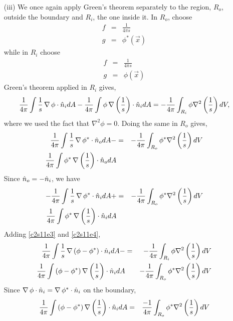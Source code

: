 \begin{enumerate}
\begin{itemize}
\item[(iii)] We once again apply Green's theorem separately to the region, $R_o$, outside the boundary and $R_i$, the one inside it. In $R_o$, choose
\begin{eqnarray*}
f &=& \frac{1}{4\pi s} \\
g &=& \phi^\ast(\vec{x})
\end{eqnarray*}
while in $R_i$ choose
\begin{eqnarray*}
f &=& \frac{1}{4\pi s} \\
g &=& \phi(\vec{x})
\end{eqnarray*}
Green's theorem applied in $R_i$ gives,
\begin{equation}\label{c2s11e3}
\frac{1}{4\pi}\int \frac{1}{s}\operatorname{\nabla}\phi\cdot\hat{n}_i dA - \frac{1}{4\pi}\int\phi\operatorname{\nabla}\left(\frac{1}{s}\right)\cdot\hat{n}_i dA = -\frac{1}{4\pi}\int_{R_i}\phi\nabla^2\left(\frac{1}{s}\right)dV,
\end{equation}
where we used the fact that $\nabla^2\phi = 0$. Doing the same in $R_o$ gives,
\begin{eqnarray*}
\frac{1}{4\pi}\int \frac{1}{s}\operatorname{\nabla}\phi^\ast\cdot\hat{n}_o dA - &=& -\frac{1}{4\pi}\int_{R_o}\phi^\ast\nabla^2\left(\frac{1}{s}\right)dV \\
\frac{1}{4\pi}\int\phi^\ast\operatorname{\nabla}\left(\frac{1}{s}\right)\cdot\hat{n}_o dA & & 
\end{eqnarray*}
Since $\hat{n}_o = -\hat{n}_i$, we have
\begin{eqnarray}
-\frac{1}{4\pi}\int \frac{1}{s}\operatorname{\nabla}\phi^\ast\cdot\hat{n}_i dA + &=& -\frac{1}{4\pi}\int_{R_o}\phi^\ast\nabla^2\left(\frac{1}{s}\right)dV \label{c2s11e4} \\
\frac{1}{4\pi}\int\phi^\ast\operatorname{\nabla}\left(\frac{1}{s}\right)\cdot\hat{n}_i dA & & \nonumber
\end{eqnarray}
Adding \eqref{c2s11e3} and \eqref{c2s11e4},
\begin{eqnarray*}
\frac{1}{4\pi}\int \frac{1}{s}\operatorname{\nabla}\left(\phi - \phi^\ast\right)\cdot\hat{n}_i dA - &=& -\frac{1}{4\pi}\int_{R_i}\phi\nabla^2\left(\frac{1}{s}\right)dV \\
\frac{1}{4\pi}\int\left(\phi - \phi^\ast\right)\operatorname{\nabla}\left(\frac{1}{s}\right)\cdot\hat{n}_i dA & & -\frac{1}{4\pi}\int_{R_o}\phi^\ast\nabla^2\left(\frac{1}{s}\right)dV
\end{eqnarray*}
Since $\operatorname{\nabla}\phi\cdot\hat{n}_i = \operatorname{\nabla}\phi^\ast\cdot\hat{n}_i$ on the boundary,
\begin{eqnarray*}
\frac{1}{4\pi}\int\left(\phi - \phi^\ast\right)\grad\left(\frac{1}{s}\right)\cdot\un_i dA &=& \frac{-1}{4\pi}\int_{R_o}\phi^\ast\nabla^2\left(\frac{1}{s}\right)dV \\

\end{eqnarray*}
\end{itemize}
\end{enumerate}
